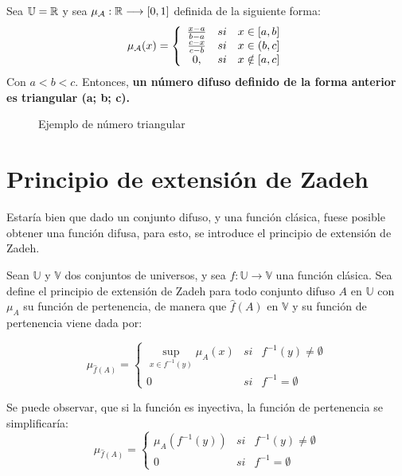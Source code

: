   \begin{ejemplo}
    Sea $\mathbb U=\mathbb R$ y sea $\mu_\mathcal{A}: \mathbb R \longrightarrow [0, 1]$ definida de la siguiente forma:
    $$
    \mu_\mathcal{A}(x)=\left\{
    \begin{array}{c c c}
      \frac{x-a}{b-a} & si & x \in [a, b] \\
      \frac{c-x}{c-b} & si & x \in (b, c] \\
	0, & si & x \notin [a, c]
    \end{array}
    \right.
    $$
    Con $a < b < c$. Entonces, \textbf{un número difuso definido de la forma anterior es triangular (a; b; c).} 
    
    \begin{figure}[h]
      \centering
      \caption{Ejemplo de número triangular}
      \label{fig:numero_difuso}
    \end{figure}
    
  \end{ejemplo}


  \section{Principio de extensión de Zadeh}
  Estaría bien que dado un conjunto difuso, y una función clásica, fuese posible obtener una función difusa, para esto, se introduce el principio de extensión de Zadeh.

  \begin{definicion}
  	\label{def:zadeh}
    Sean $\mathbb{U}$ y $\mathbb{V}$ dos conjuntos de universos, y sea $f: \mathbb{U} \longrightarrow \mathbb{V}$ una función clásica. Sea define el principio de extensión de Zadeh para todo conjunto difuso $A$ en $\mathbb{U}$ con $\mu_A$ su función de pertenencia, de manera que $\hat{f}(A)$ en $\mathbb{V}$ y su función de pertenencia viene dada por:
    
    $$
    \mu_{\hat{f}(A)}=\left\{
    \begin{array}{ccc}
      \sup_{x\in f^{-1}(y)} \mu_A(x) & si & f^{-1}(y)\neq\emptyset\\
      0 & si & f^{-1}=\emptyset
    \end{array}
    \right.
    $$
  \end{definicion}


  Se puede observar, que si la función es inyectiva, la función de pertenencia se simplificaría:
  $$
  \mu_{\hat{f}(A)}=\left\{
  \begin{array}{ccc}
    \mu_A(f^{-1}(y)) & si & f^{-1}(y)\neq\emptyset\\
    0 & si & f^{-1}=\emptyset
  \end{array}
  \right.
  $$

